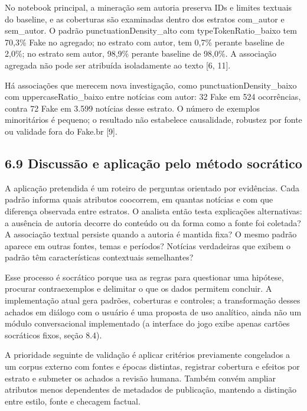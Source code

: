 \documentclass[
  brazilian,
  11pt,
]{article}
\begin{document}
No notebook principal, a mineração sem autoria preserva IDs e limites textuais do baseline, e as coberturas são examinadas dentro dos estratos com\_autor e sem\_autor. O padrão punctuationDensity\_alto com typeTokenRatio\_baixo tem 70,3\% Fake no agregado; no estrato com autor, tem 0,7\% perante baseline de 2,0\%; no estrato sem autor, 98,9\% perante baseline de 98,0\%. A associação agregada não pode ser atribuída isoladamente ao texto {[}6, 11{]}.

Há associações que merecem nova investigação, como punctuationDensity\_baixo com uppercaseRatio\_baixo entre notícias com autor: 32 Fake em 524 ocorrências, contra 72 Fake em 3.599 notícias desse estrato. O número de exemplos minoritários é pequeno; o resultado não estabelece causalidade, robustez por fonte ou validade fora do Fake.br {[}9{]}.

\subsection{6.9 Discussão e aplicação pelo método socrático}\label{discussuxe3o-e-aplicauxe7uxe3o-pelo-muxe9todo-socruxe1tico}

A aplicação pretendida é um roteiro de perguntas orientado por evidências. Cada padrão informa quais atributos coocorrem, em quantas notícias e com que diferença observada entre estratos. O analista então testa explicações alternativas: a ausência de autoria decorre do conteúdo ou da forma como a fonte foi coletada? A associação textual persiste quando a autoria é mantida fixa? O mesmo padrão aparece em outras fontes, temas e períodos? Notícias verdadeiras que exibem o padrão têm características contextuais semelhantes?

Esse processo é socrático porque usa as regras para questionar uma hipótese, procurar contraexemplos e delimitar o que os dados permitem concluir. A implementação atual gera padrões, coberturas e controles; a transformação desses achados em diálogo com o usuário é uma proposta de uso analítico, ainda não um módulo conversacional implementado (a interface do jogo exibe apenas cartões socráticos fixos, seção 8.4).

A prioridade seguinte de validação é aplicar critérios previamente congelados a um corpus externo com fontes e épocas distintas, registrar cobertura e efeitos por estrato e submeter os achados a revisão humana. Também convém ampliar atributos menos dependentes de metadados de publicação, mantendo a distinção entre estilo, fonte e checagem factual.
\end{document}

